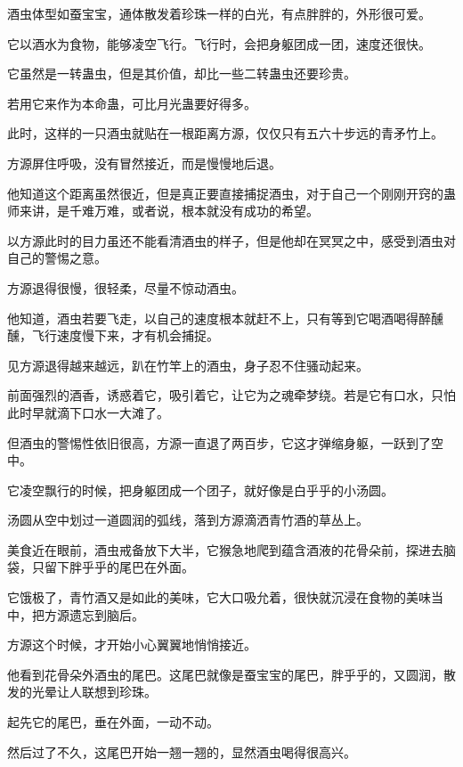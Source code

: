 
\begin{this_body}



酒虫体型如蚕宝宝，通体散发着珍珠一样的白光，有点胖胖的，外形很可爱。

它以酒水为食物，能够凌空飞行。飞行时，会把身躯团成一团，速度还很快。

它虽然是一转蛊虫，但是其价值，却比一些二转蛊虫还要珍贵。

若用它来作为本命蛊，可比月光蛊要好得多。

此时，这样的一只酒虫就贴在一根距离方源，仅仅只有五六十步远的青矛竹上。

方源屏住呼吸，没有冒然接近，而是慢慢地后退。

他知道这个距离虽然很近，但是真正要直接捕捉酒虫，对于自己一个刚刚开窍的蛊师来讲，是千难万难，或者说，根本就没有成功的希望。

以方源此时的目力虽还不能看清酒虫的样子，但是他却在冥冥之中，感受到酒虫对自己的警惕之意。

方源退得很慢，很轻柔，尽量不惊动酒虫。

他知道，酒虫若要飞走，以自己的速度根本就赶不上，只有等到它喝酒喝得醉醺醺，飞行速度慢下来，才有机会捕捉。

见方源退得越来越远，趴在竹竿上的酒虫，身子忍不住骚动起来。

前面强烈的酒香，诱惑着它，吸引着它，让它为之魂牵梦绕。若是它有口水，只怕此时早就滴下口水一大滩了。

但酒虫的警惕性依旧很高，方源一直退了两百步，它这才弹缩身躯，一跃到了空中。

它凌空飘行的时候，把身躯团成一个团子，就好像是白乎乎的小汤圆。

汤圆从空中划过一道圆润的弧线，落到方源滴洒青竹酒的草丛上。

美食近在眼前，酒虫戒备放下大半，它猴急地爬到蕴含酒液的花骨朵前，探进去脑袋，只留下胖乎乎的尾巴在外面。

它饿极了，青竹酒又是如此的美味，它大口吸允着，很快就沉浸在食物的美味当中，把方源遗忘到脑后。

方源这个时候，才开始小心翼翼地悄悄接近。

他看到花骨朵外酒虫的尾巴。这尾巴就像是蚕宝宝的尾巴，胖乎乎的，又圆润，散发的光晕让人联想到珍珠。

起先它的尾巴，垂在外面，一动不动。

然后过了不久，这尾巴开始一翘一翘的，显然酒虫喝得很高兴。


\end{this_body}
